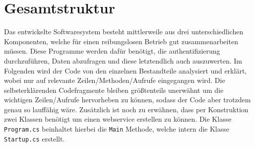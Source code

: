 \section{Gesamtstruktur}\label{sec:gesamtstruktur}

	Das entwickelte Softwaresystem besteht mittlerweile aus drei unterschiedlichen Komponenten,
	welche für einen reibungslosen Betrieb gut zusammenarbeiten müssen.
	Diese Programme werden dafür benötigt,
	die \gls{authentifizierung} durchzuführen,
	Daten abzufragen und diese letztendlich auch auszuwerten.
	Im Folgenden wird der Code von den einzelnen Bestandteile analysiert und erklärt,
	wobei nur auf relevante Zeilen/Methoden/Aufrufe eingegangen wird.
	Die selbsterklärenden Codefragmente bleiben größtenteils unerwähnt
	um die wichtigen Zeilen/Aufrufe hervorheben zu können,
	sodass der Code aber trotzdem genau so lauffähig wäre.
	Zusätzlich ist noch zu erwähnen,
	dass  per Konstruktion zwei Klassen benötigt
	um einen \gls{webservice} erstellen zu können.
	Die Klasse \lstinline!Program.cs! beinhaltet hierbei die \lstinline!Main! Methode,
	welche intern die Klasse \lstinline!Startup.cs! erstellt.

	
	
	
	

